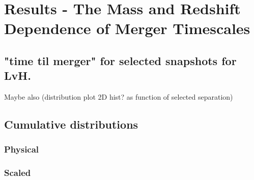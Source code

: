 \documentclass[twocolumn]{aastex631}
\newcommand{\kc}[1]{\textcolor{yellow}{\textbf{kc: #1}} }
\newcommand{\paircat}{\textit{Full Pair Catalog}}
\newcommand{\Rphys}{\ensuremath{\rm R_{phys}}}
\newcommand{\rsep}{\ensuremath{\rm r_{sep}}}
\begin{document}

\section{Results - The Mass and Redshift Dependence of Merger Timescales}
\subsection{"time til merger" for selected snapshots for LvH.}
Maybe also (distribution plot 2D hist? as function of selected separation)
\subsection{Cumulative distributions}
\subsubsection{Physical}
\subsubsection{Scaled}

\end{document}
